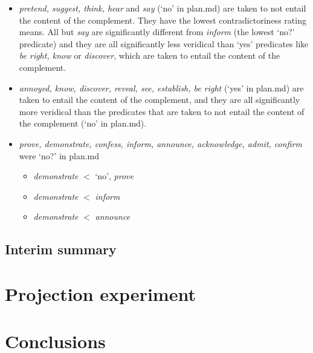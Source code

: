\documentclass[11pt,fleqn]{article}
\newcommand{\6}{\mbox{$[\hspace*{-.6mm}[$}}
\newcommand{\9}{\mbox{$]\hspace*{-.6mm}]$}}
\begin{document}
\begin{itemize}

\item {\em pretend, suggest, think, hear} and {\em say} (`no' in plan.md) are taken to not entail the content of the complement. They have the lowest contradictoriness rating means. All but {\em say} are significantly different from {\em inform} (the lowest `no?' predicate) and they are all significantly less veridical than `yes' predicates like {\em be right, know} or {\em discover}, which are taken to entail the content of the complement.

\item {\em annoyed, know, discover, reveal, see, establish, be right} (`yes' in plan.md) are taken to entail the content of the complement, and they are all significantly more veridical than the predicates that are taken to not entail the content of the complement (`no' in plan.md).

\item {\em prove, demonstrate, confess, inform, announce, acknowledge, admit, confirm} were `no?' in plan.md

\begin{itemize}

\item {\em demonstrate} $<$ `no',  {\em prove}

\item {\em demonstrate} $<$ {\em inform}

\item {\em demonstrate} $<$ {\em announce}

\end{itemize}

\end{itemize}

\subsection{Interim summary}

\section{Projection experiment}

\section{Conclusions}\label{s6}


\appendix

\setcounter{table}{0}
\renewcommand{\thetable}{A\arabic{table}}
\end{document}

